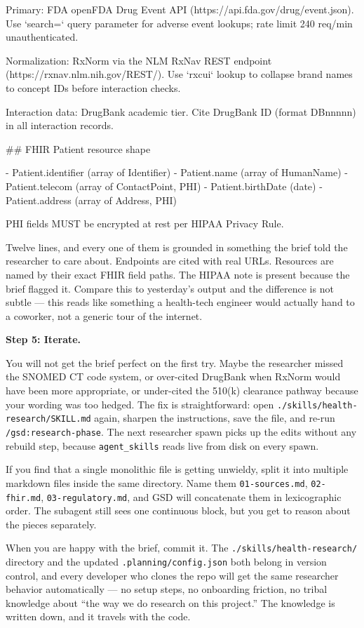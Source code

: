 \documentclass[11pt,letterpaper,openany]{book}
\begin{document}
\begin{gsdscenario}
\begin{gsdplain}
Primary: FDA openFDA Drug Event API
  (https://api.fda.gov/drug/event.json). Use `search=` query
  parameter for adverse event lookups; rate limit 240 req/min
  unauthenticated.

Normalization: RxNorm via the NLM RxNav REST endpoint
  (https://rxnav.nlm.nih.gov/REST/). Use `rxcui` lookup to
  collapse brand names to concept IDs before interaction checks.

Interaction data: DrugBank academic tier. Cite DrugBank ID
  (format DBnnnnn) in all interaction records.

## FHIR Patient resource shape

- Patient.identifier  (array of Identifier)
- Patient.name        (array of HumanName)
- Patient.telecom     (array of ContactPoint, PHI)
- Patient.birthDate   (date)
- Patient.address     (array of Address, PHI)

PHI fields MUST be encrypted at rest per HIPAA Privacy Rule.
\end{gsdplain}

Twelve lines, and every one of them is grounded in something the
brief told the researcher to care about. Endpoints are cited with
real URLs. Resources are named by their exact FHIR field paths. The
HIPAA note is present because the brief flagged it. Compare this to
yesterday's output and the difference is not subtle --- this reads
like something a health-tech engineer would actually hand to a
coworker, not a generic tour of the internet.

\textbf{\large Step 5: Iterate.}

You will not get the brief perfect on the first try. Maybe the
researcher missed the SNOMED CT code system, or over-cited DrugBank
when RxNorm would have been more appropriate, or under-cited the
510(k) clearance pathway because your wording was too hedged. The
fix is straightforward: open \texttt{./skills/health-research/SKILL.md}
again, sharpen the instructions, save the file, and re-run
\texttt{/gsd:research-phase}. The next researcher spawn picks up the
edits without any rebuild step, because \texttt{agent\_skills} reads
live from disk on every spawn.

If you find that a single monolithic file is getting unwieldy, split
it into multiple markdown files inside the same directory. Name them
\texttt{01-sources.md}, \texttt{02-fhir.md}, \texttt{03-regulatory.md},
and GSD will concatenate them in lexicographic order. The subagent
still sees one continuous block, but you get to reason about the
pieces separately.

When you are happy with the brief, commit it. The
\texttt{./skills/health-research/} directory and the updated
\texttt{.planning/config.json} both belong in version control, and
every developer who clones the repo will get the same researcher
behavior automatically --- no setup steps, no onboarding friction,
no tribal knowledge about ``the way we do research on this project.''
The knowledge is written down, and it travels with the code.

\end{gsdscenario}
\end{document}
